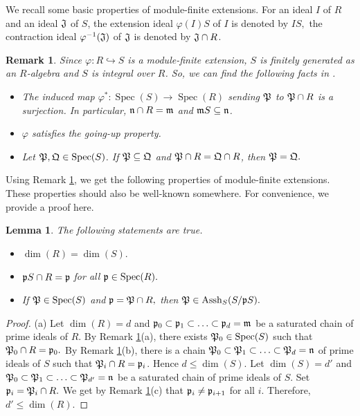 \documentclass[a4papersize]{article}
\newtheorem{lemma}[theorem]{Lemma}
\newtheorem{remark}[theorem]{Remark}
\DeclareMathOperator{\Assh}{Assh}
\DeclareMathOperator{\Spec}{Spec}
\begin{document}
{We recall some basic properties of module-finite extensions. For an ideal $I$ of $R$ and an ideal  $\frak J$ of $S$, the extension ideal $\varphi(I)S$ of $I$ is denoted by $IS,$ the contraction ideal $\varphi^{-1}(\frak J)$ of $\frak J$ is denoted by $\frak J\cap R$.  

\begin{remark}\label{R:3} {\rm Since $\varphi: R\hookrightarrow S$ is a module-finite extension,  $S$ is finitely generated as an $R$-algebra and $S$ is integral over $R$. So, we can find  the following facts in   \cite[Chapter 5]{AM}.}
\begin{itemize}
\item [{\rm (a)}]  {\rm The induced map $\varphi^*:  \Spec(S)\to \Spec(R)$ sending $\frak P$ to $\frak P\cap R$ is a surjection. In particular, $\frak n\cap R=\frak m$ and $\frak mS\subseteq\frak n$}.
\item [{\rm (b)}] {\rm $\varphi$ satisfies the going-up property.} 
\item [{\rm (c)}] {\rm Let $\frak P, \frak Q\in\Spec (S)$. If $\frak P\subseteq \frak Q$ and $\frak P\cap R=\frak Q\cap R$, then $\frak P=\frak Q.$}
\end{itemize}
\end{remark}

Using Remark \ref{R:3}, we get the following properties of module-finite extensions. These properties should also be well-known somewhere. For convenience, we provide a proof here. 
	
\begin{lemma}\label{L:3a} The following statements are true.
\begin{itemize}
\item [{\rm (a)}] $\dim (R)=\dim (S).$
\item [{\rm (b)}] $\frak pS\cap R=\frak p$ for all  $\frak p\in\Spec(R).$ 
\item [{\rm (c)}] If $\frak P\in\Spec(S)$ and $\frak p=\frak P\cap R,$ then $\frak P\in\Assh_S(S/\frak pS).$
\end{itemize}
\end{lemma}
	
\begin{proof} (a) Let $\dim (R)=d$ and $\frak p_0\subset  \frak p_1\subset \ldots \subset \frak p_d=\frak m$ be a saturated chain of prime ideals of $R$. By Remark \ref{R:3}(a), there exists $\frak P_0\in\Spec(S)$ such that $\frak P_0\cap R=\frak p_0.$ By Remark \ref{R:3}(b), there is a chain $\frak P_0\subset  \frak P_1\subset \ldots \subset \frak P_d=\frak n$  of prime ideals of $S$ such that $\frak P_i\cap R=\frak p_i$. Hence $d\leq \dim (S).$ Let $\dim(S)=d'$ and $\frak P_0\subset  \frak P_1\subset \ldots \subset \frak P_{d'}=\frak n$ be a saturated chain of prime ideals of $S$. Set $\frak p_i=\frak P_i\cap R.$ We get by Remark \ref{R:3}(c)  that $\frak p_i\neq \frak p_{i+1}$ for all $i$. Therefore, $d'\leq \dim (R).$  
				

\end{proof}}
\end{document}
